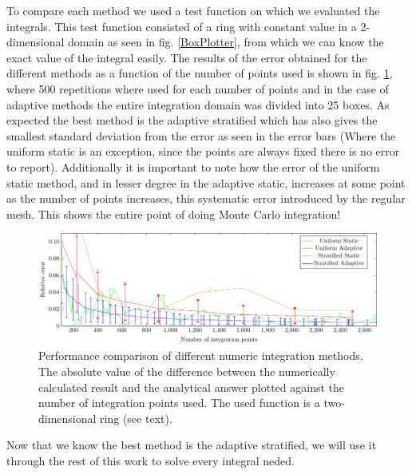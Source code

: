 To compare each method we used a test function on which we evaluated the integrals.
This test function consisted of a ring with constant value in a 2-dimensional domain as seen in fig. \ref{BoxPlotter}, from which
we can know the exact value of the integral easily. The results
of the error obtained for the different methods as a function of the number of points used is shown in fig. \ref{MCerrs},
 where 500 repetitions where used for each number of points and in the case of adaptive methods the entire integration
 domain was divided into 25 boxes. As
expected the best method is the adaptive stratified which has also gives the smallest standard deviation from the error as seen in the error bars (Where
the uniform static is an exception, since the points are always fixed there is no error to report).
Additionally it is important to note how the error of the uniform static method, and in lesser degree in the adaptive static,
 increases at some point as the number of points increases, this systematic error introduced by the regular mesh. This shows the entire point of doing Monte Carlo integration!
\begin{figure}[ht]
  \begin{center}
  \includegraphics[scale=1 ]{graphs/integration_test_ring.pdf}
  \caption{Performance comparison of different numeric integration methods. The absolute value of the difference between the numerically calculated result and the analytical answer plotted against the number of integration points used. The used function is a two-dimensional ring (see text).}
  \label{MCerrs}
  \end{center}
\end{figure}

Now that we know the best method is the adaptive stratified, we will use it through the rest of this work to solve every integral neded.
